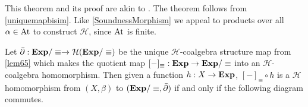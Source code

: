 \documentclass[a4paper,UKenglish,cleveref, autoref, thm-restate]{lipics-v2021}
\newcommand{\At}{\text{\upshape{At}}}
\newcommand{\Exp}{\textbf{\upshape{Exp}}}
\newcommand{\HCo}{$\mathcal{H}$\text{-coalgebra }}
\theoremstyle{plain}\newtheoremrep{thm}{Theorem}[section]
\begin{document}
	\begin{appendixproof}		
		This theorem and its proof are akin to \cite[Theorem 21]{rozowski2023probabilistic}. The theorem follows from \cref{uniquemapbisim}. Like \cref{SoundnessMorphism} we appeal to products over all $\alpha \in \At$ to construct $\mathcal H$, since $\At$ is finite.
		
		Let $\bar\partial: \Exp/\equiv \to \mathcal{H}(\Exp/\equiv)$ be the unique $\mathcal{H}$-coalgebra structure map from \cref{lem65} which makes the quotient map $[-]_\equiv:\Exp\to\Exp/\equiv$ into an $\mathcal H$-coalgebra homomorphism. Then given a function $h: X \to \Exp$, $[-]_\equiv \circ h$ is a \HCo homomorphism from $(X, \beta)$ to $(\Exp/\equiv, \bar\partial)$ if and only if the following diagram commutes.
		\begin{center}  \end{center}
		

\end{appendixproof}
\end{document}
